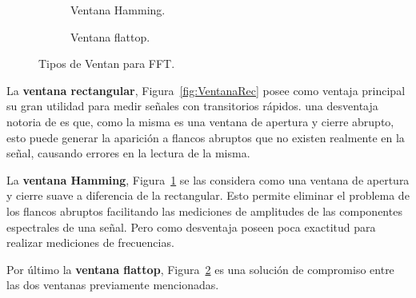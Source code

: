 \begin{figure}[H]
\begin{subfigure}[H]{0.45\textwidth}
            \caption{Ventana Hamming.}
            \label{fig:VentanaHamming}
            \end{subfigure}
            \hfill 
            \begin{subfigure}[H]{0.45\textwidth}
            \caption{Ventana flattop.}
            \label{fig:VentanaFlattop}
            \end{subfigure}

            \caption{Tipos de Ventan para FFT.}
            \label{fig:VentanasTipos}
        \end{figure}
    
    La \textbf{ventana rectangular}, Figura~\ref{fig:VentanaRec} posee como ventaja principal su 
    gran utilidad para medir señales con transitorios rápidos. una desventaja notoria de 
    es que, como la misma es una ventana de apertura y cierre abrupto, esto puede 
    generar la aparición a flancos abruptos que no existen realmente en la señal, causando 
    errores en la lectura de la misma.
    
    La \textbf{ventana Hamming}, Figura~\ref{fig:VentanaHamming} se las considera como una ventana de 
    apertura y cierre suave a diferencia de la rectangular. Esto permite eliminar el problema
    de los flancos abruptos facilitando las mediciones de amplitudes de las componentes 
    espectrales de una señal. Pero como desventaja poseen poca exactitud para realizar 
    mediciones de frecuencias.
    
    Por último la \textbf{ventana flattop}, Figura~\ref{fig:VentanaFlattop} es una solución de compromiso
    entre las dos ventanas previamente mencionadas. 

